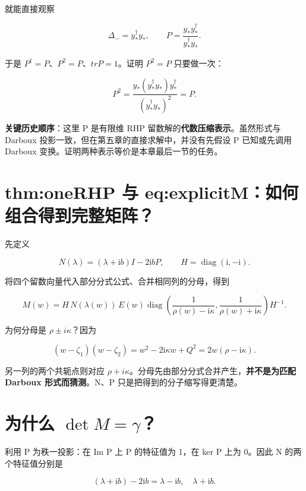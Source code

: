 就能直接观察\par

\[
\Delta_-=y_*^\dagger y_*,
\qquad P=\dfrac{y_*y_*^\dagger}{y_*^\dagger y_*}.
\]

于是 $P^\dagger=P$、$P^{2}=P$、$tr P=1$。证明 $P^{2}=P$ 只要做一次：\par

\[
P^2=\dfrac{y_*(y_*^\dagger y_*)y_*^\dagger}
{(y_*^\dagger y_*)^2}
=P.
\]

\textbf{关键历史顺序}：这里 P 是有限维 RHP 留数解的\textbf{代数压缩表示}。虽然形式与 Darboux 投影一致，但在第五章的直接求解中，并没有先假设 P 已知或先调用 Darboux 变换。证明两种表示等价是本章最后一节的任务。\par

\section{thm:oneRHP 与 eq:explicitM：如何组合得到完整矩阵？}

先定义\par

\[
N(\lambda)=(\lambda+\mathrm{i}b)I-2\mathrm{i}bP,\qquad
H=\operatorname{diag}(\mathrm{i},-\mathrm{i}).
\]

将四个留数向量代入部分分式公式、合并相同列的分母，得到\par

\[
\boxed{
M(w)=H\,N(\lambda(w))\,E(w)
\operatorname{diag}\left(
\dfrac{1}{\rho(w)-\mathrm{i}\kappa},
\dfrac{1}{\rho(w)+\mathrm{i}\kappa}
\right)H^{-1}.
}
\]

为何分母是 $\rho{}\pm{}i\kappa{}$？因为\par

\[
(w-\zeta_1)(w-\zeta_2)
=w^2-2\mathrm{i}\kappa w+Q^2
=2w(\rho-\mathrm{i}\kappa).
\]

另一列的两个共轭点则对应 $\rho{}+i\kappa{}$。分母先由部分分式合并产生，\textbf{并不是为匹配 Darboux 形式而猜测}。N、P 只是把得到的分子缩写得更清楚。\par

\section{为什么 \texorpdfstring{$\det M=\gamma$}{det M=gamma}？}

利用 P 为秩一投影：在 Im P 上 P 的特征值为 1，在 ker P 上为 0。因此 N 的两个特征值分别是\par

\[
(\lambda+\mathrm{i}b)-2\mathrm{i}b=\lambda-\mathrm{i}b,
\quad
\lambda+\mathrm{i}b.
\]

